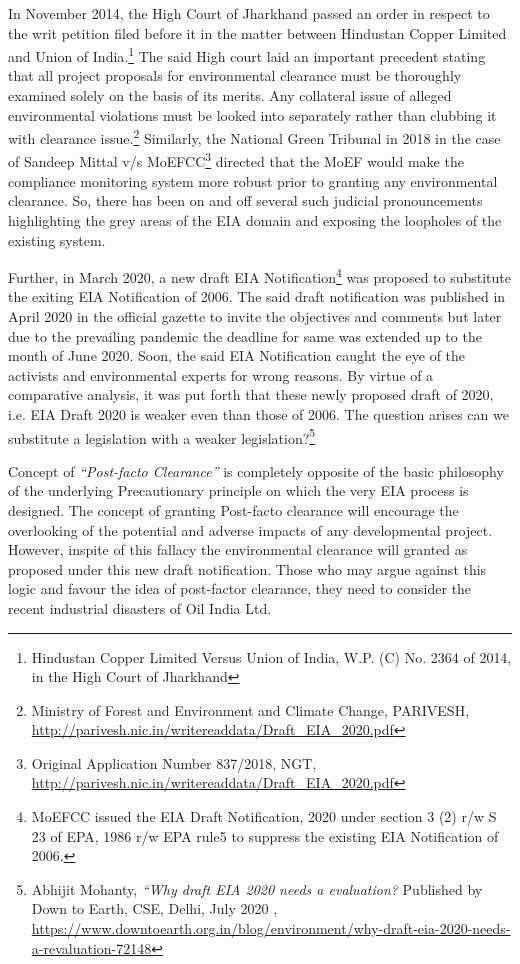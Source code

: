\begin{multicols}{2}

\noi
In November 2014, the High Court of Jharkhand passed an order in respect to the writ
petition filed before it in the matter between Hindustan Copper Limited and Union of India.\footnote{Hindustan Copper Limited Versus Union of India, W.P. (C) No. 2364 of 2014, in the High Court of
Jharkhand}
The said High court laid an important precedent stating that all project proposals for
environmental clearance must be thoroughly examined solely on the basis of its merits. Any
collateral issue of alleged environmental violations must be looked into separately rather than
clubbing it with clearance issue.\footnote{Ministry of Forest and Environment and Climate Change, PARIVESH,
\url{http://parivesh.nic.in/writereaddata/Draft_EIA_2020.pdf}} Similarly, the National Green Tribunal in 2018 in the case
of Sandeep Mittal v/s MoEFCC\footnote{Original Application Number 837/2018, NGT, \url{http://parivesh.nic.in/writereaddata/Draft_EIA_2020.pdf}} directed that the MoEF would make the compliance
monitoring system more robust prior to granting any environmental clearance. So, there has
been on and off several such judicial pronouncements highlighting the grey areas of the EIA
domain and exposing the loopholes of the existing system.

\noi
Further, in March 2020, a new draft EIA Notification\footnote{MoEFCC issued the EIA Draft Notification, 2020 under section 3 (2) r/w S 23 of EPA, 1986 r/w EPA rule5 to
suppress the existing EIA Notification of 2006.} was proposed to substitute the exiting
EIA Notification of 2006. The said draft notification was published in April 2020 in the
official gazette to invite the objectives and comments but later due to the prevailing pandemic
the deadline for same was extended up to the month of June 2020. Soon, the said EIA
Notification caught the eye of the activists and environmental experts for wrong reasons. By
virtue of a comparative analysis, it was put forth that these newly proposed draft of 2020, i.e.
EIA Draft 2020 is weaker even than those of 2006. The question arises can we substitute a
legislation with a weaker legislation?\footnote{Abhijit Mohanty, \textit{“Why draft EIA 2020 needs a evaluation?} Published by Down to Earth, CSE, Delhi, July
2020 , \url{https://www.downtoearth.org.in/blog/environment/why-draft-eia-2020-needs-a-revaluation-72148}}

\noi
Concept of \textit{“Post-facto Clearance”} is completely opposite of the basic philosophy of the
underlying Precautionary principle on which the very EIA process is designed. The concept
of granting Post-facto clearance will encourage the overlooking of the potential and adverse impacts of any developmental project. However, inspite of this fallacy the environmental
clearance will granted as proposed under this new draft notification. Those who may argue
against this logic and favour the idea of post-factor clearance, they need to consider the recent
industrial disasters of Oil India Ltd.


\end{multicols}

